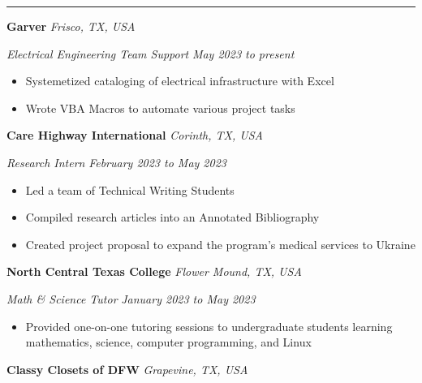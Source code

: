 \documentclass[10pt, a4paper]{article}
\newcommand{\rangesep}{to\xspace}  %
\renewcommand{\date}[1]{\textit{#1}}
\newcommand{\location}[1]{\textit{#1}}
\newcommand{\heading}[1]{
    \makebox[0pt][l]{\Large \sc \hspace{2pt}#1}
    \rule[-0.7ex]{\columnwidth}{0.5pt}\vspace{1.0ex}
}
\newcommand{\subheading}[1]{{\bfseries #1}}
\newcommand{\subheadSkip}{\vspace{0.7ex}}
\newenvironment{mysection}[1]
{\vspace{2.5ex}
\heading{#1}
\begin{adjustwidth}{0.3cm}{0cm}}
{\end{adjustwidth} }
\begin{document}
    \begin{mysection}{Employment}
        \subheading{Garver} \hfill \location{Frisco, TX, USA}

        \textit{Electrical Engineering Team Support} \hfill \date{May 2023 \rangesep present}
        \vspace{0.1ex}
        \begin{itemize}
            \item Systemetized cataloging of electrical infrastructure with Excel
            \item Wrote VBA Macros to automate various project tasks
        \end{itemize}
        \subheadSkip
        \subheading{Care Highway International} \hfill \location{Corinth, TX, USA}

        \textit{Research Intern} \hfill \date{February 2023 \rangesep May 2023}
        \vspace{0.1ex}
        \begin{itemize}
            \item Led a team of Technical Writing Students
            \item Compiled research articles into an Annotated Bibliography
            \item Created project proposal to expand the program's medical services to Ukraine
        \end{itemize}
        \subheadSkip
        \subheading{North Central Texas College} \hfill \location{Flower Mound, TX, USA}

        \vspace{0.1ex}
        \textit{Math \& Science Tutor} \hfill \date{January 2023 \rangesep May 2023}
        \begin{itemize}
            \item Provided one-on-one tutoring sessions to undergraduate students learning mathematics, science, computer programming, and Linux
        \end{itemize}
        \subheadSkip
        \subheading{Classy Closets of DFW} \hfill \location{Grapevine, TX, USA}


\end{mysection}
\end{document}
